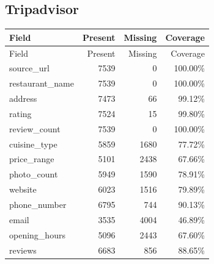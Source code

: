 \subsection{Tripadvisor}
{\small
\begin{longtable}{lrrr}
\toprule
Field & Present & Missing & Coverage \\
\midrule
\endfirsthead
\toprule
Field & Present & Missing & Coverage \\
\midrule
\endhead
source\_url & 7539 & 0 & 100.00\% \\
restaurant\_name & 7539 & 0 & 100.00\% \\
address & 7473 & 66 & 99.12\% \\
rating & 7524 & 15 & 99.80\% \\
review\_count & 7539 & 0 & 100.00\% \\
cuisine\_type & 5859 & 1680 & 77.72\% \\
price\_range & 5101 & 2438 & 67.66\% \\
photo\_count & 5949 & 1590 & 78.91\% \\
website & 6023 & 1516 & 79.89\% \\
phone\_number & 6795 & 744 & 90.13\% \\
email & 3535 & 4004 & 46.89\% \\
opening\_hours & 5096 & 2443 & 67.60\% \\
reviews & 6683 & 856 & 88.65\% \\
\bottomrule
\end{longtable}
}
